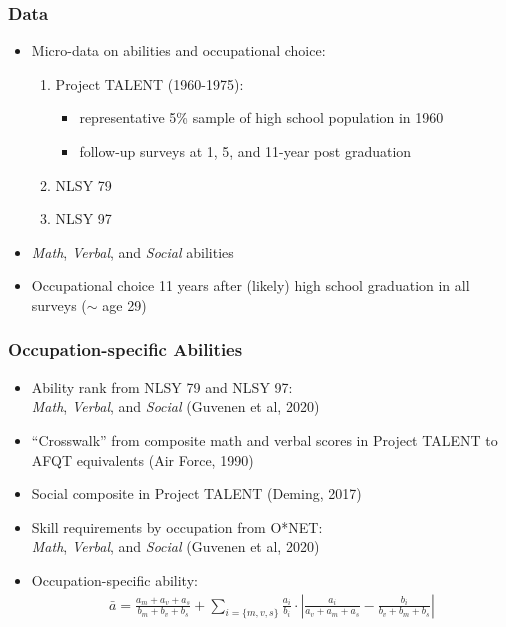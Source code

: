 \documentclass[11pt]{beamer}
\begin{document}
\begin{frame}
\frametitle{Data}
\begin{itemize}
	\item Micro-data on abilities and occupational choice:
	\begin{enumerate}
		\item Project TALENT (1960-1975):
		\begin{itemize}
			\item representative 5\% sample of high school population in 1960
			\item follow-up surveys at 1, 5, and 11-year post graduation
		\end{itemize}
		\item NLSY 79
		\item NLSY 97
	\end{enumerate}
	\item \textit{Math}, \textit{Verbal}, and \textit{Social} abilities
	\item Occupational choice 11 years after (likely) high school graduation in all surveys ($\sim$ age 29)
\end{itemize}
\end{frame}

\begin{frame}
\frametitle{Occupation-specific Abilities}
\begin{itemize}
	\item Ability rank from NLSY 79 and NLSY 97: \\
	\textit{Math}, \textit{Verbal}, and \textit{Social} (Guvenen et al, 2020)
	\item ``Crosswalk'' from composite math and verbal scores in Project TALENT to AFQT equivalents (Air Force, 1990)
	\item Social composite in Project TALENT (Deming, 2017)
	\item Skill requirements by occupation from O*NET: \\
	\textit{Math}, \textit{Verbal}, and \textit{Social} (Guvenen et al, 2020)
	\item Occupation-specific ability:
	\begin{align*}
		\bar{a}=\frac{a_m+a_v+a_s}{b_m+b_v+b_s}+\sum_{i=\{m,v,s\}}\frac{a_i}{b_i}\cdot\left|\frac{a_i}{a_v+a_m+a_s}-\frac{b_i}{b_v+b_m+b_s}\right|\nonumber
	\end{align*}  
\end{itemize}
\end{frame}
\end{document}
